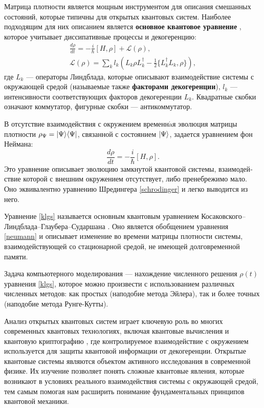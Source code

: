 Матрица плотности является мощным инструментом для описания смешанных состояний, которые типичны для открытых квантовых систем. Наиболее подходящим для них описанием является \textbf{основное квантовое уравнение} \cite{breuer}, которое учитывает диссипативные процессы и декогеренцию:
\begin{equation}\label{klgs}
\begin{gathered}
	\frac{d\rho}{dt} = -\frac{i}{\hbar}[H, \rho] + \mathcal{L}(\rho),\\[12pt]
	{\mathcal L}(\rho)=\sum_{k} l_{k}\left(L_{k} \rho L_{k}^{\dagger} - \frac{1}{2} \{L_{k}^{\dagger}L_{k}, \rho \} \right),
\end{gathered}
\end{equation}
где $L_{k}$ --- операторы Линдблада, которые описывают взаимодействие системы с окружающей средой (называемые также \textbf{факторами декогеренции}), $l_{k}$ --- интенсивности соответствующих факторов декогеренции $L_{k}$. Квадратные скобки означают коммутатор, фигурные скобки --- антикоммутатор.

В отсутствие взаимодействия с окружением временн$\acute{\text{a}}$я эволюция матрицы плотности $\rho_{\Psi} = |\Psi\rangle\langle\Psi|$, связанной с состоянием $|\Psi\rangle$, задается уравнением фон Неймана:
\begin{equation}\label{neumann}
	\frac{d\rho}{dt} = -\frac{i}{\hbar}[H, \rho].
\end{equation}
\noindent Это уравнение описывает эволюцию замкнутой квантовой системы, взаимодей­ствие которой с внешним окружением отсутствует, либо пренебрежимо мало. Оно эквивалентно уравнению Шредингера \eqref{schrodinger} и легко выводится из него.

Уравнение \eqref{klgs} называется основным квантовым уравнением Ко­саковского–Линдблада–Глаубера–Сударшана \cite{breuer}. Оно является обобще­нием уравнения \eqref{neumann} и описывает изменение во времени матрицы плотности системы, взаимодействующей со стационарной средой, не имеющей долговре­менной памяти.

Задача компьютерного моделирования — нахождение численного решения $\rho(t)$ уравнения \eqref{klgs}, которое можно произвести с использованием различных численных методов: как простых (наподобие метода Эйлера), так и более точ­ных (наподобие метода Рунге-Кутты).

Анализ открытых квантовых систем играет ключевую роль во многих современных квантовых технологиях, включая квантовые вычисления и квантовую криптографию \cite{akm2017}, где контролируемое взаимодействие с окру­жением используется для защиты квантовой информации от декогеренции. Открытые квантовые системы являются объектом активного исследования в со­временной физике. Их изучение позволяет понять сложные квантовые явления, которые возникают в условиях реального взаимодействия системы с окружаю­щей средой, тем самым помогая нам расширить понимание фундаментальных принципов квантовой механики.

